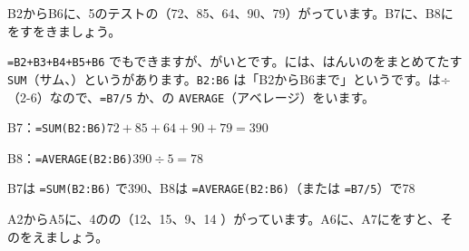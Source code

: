 \begin{reidai}[\R{合計}{ごう|けい}と\R{平均}{へい|きん}を\R{出}{だ}す\R{命令}{めい|れい}]
B2からB6に、5のテストの（72、85、64、90、79）がっています。B7に、B8にをすをきましょう。\par
\noindent\begin{minipage}[t]{0.58\linewidth}
\kangaekata \texttt{=B2+B3+B4+B5+B6} でもできますが、がいとです。には、はんいのをまとめてたす \texttt{SUM}（サム、）というがあります。\texttt{B2:B6} は「B2からB6まで」というです。は÷（2-6）なので、\texttt{=B7/5} か、の \texttt{AVERAGE}（アベレージ）をいます。\par
\shiki B7：\texttt{=SUM(B2:B6)}\quad $72+85+64+90+79=390$\par
\hspace*{2.6\zw}B8：\texttt{=AVERAGE(B2:B6)}\quad $390\div5=78$\par
\kotae B7は \texttt{=SUM(B2:B6)} で390、B8は \texttt{=AVERAGE(B2:B6)}（または \texttt{=B7/5}）で78
\end{minipage}\hfill
\begin{minipage}[t]{0.38\linewidth}\vspace{2pt}\raggedleft
{}
\end{minipage}
\end{reidai}

\begin{jibun}
A2からA5に、4のの（12、15、9、14 ）がっています。A6に、A7にをすと、そのをえましょう。
\end{jibun}

